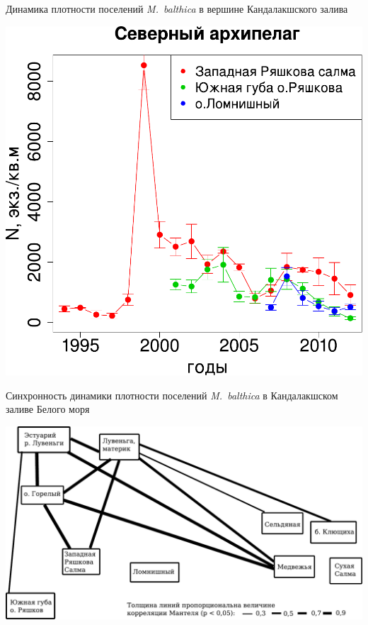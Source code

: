 \documentclass{beamer}
\begin{document}
\begin{frame}{Динамика плотности поселений {\it M.~balthica} в вершине Кандалакшского залива}
\begin{minipage}[t]{.49\linewidth}
\begin{center}
			\includegraphics[width=\textwidth]{N2_dynamic_North_big1.pdf}
		\end{center}
	\end{minipage}
\end{frame}

\begin{frame}{Синхронность динамики плотности поселений {\it M.~balthica} в Кандалакшском заливе Белого моря}
		\begin{center}
			\includegraphics[width=\textwidth]{mantel1.pdf}
		\end{center}
\end{frame}
\end{document}
